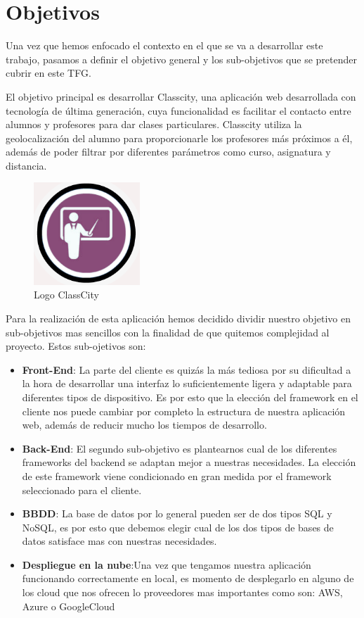 \chapter{Objetivos}
Una vez que hemos enfocado el contexto en el que se va a desarrollar este trabajo, pasamos a definir el objetivo general y los sub-objetivos que se pretender cubrir en este TFG.

El objetivo principal es desarrollar Classcity, una aplicación web desarrollada con tecnología de última  generación, cuya funcionalidad es facilitar el contacto entre alumnos y profesores para dar clases particulares. Classcity utiliza la geolocalización del alumno para proporcionarle los profesores más próximos a él, además de poder filtrar por diferentes parámetros como curso, asignatura y distancia.

\begin{figure}[!h]
    \centering
    \includegraphics[width=40mm]{img/introduccion/logo.jpg}
    \caption{Logo ClassCity}
\end{figure}

Para la realización de esta aplicación hemos decidido dividir nuestro objetivo en sub-objetivos mas sencillos con la finalidad de que quitemos complejidad al proyecto. Estos sub-ojetivos son:
\begin{itemize}

    \item \textbf {Front-End}: La parte del cliente es quizás la más tediosa por su dificultad a la hora de desarrollar una interfaz lo suficientemente ligera y adaptable para diferentes tipos de dispositivo. Es por esto que la elección del framework en el cliente nos puede cambiar por completo la estructura de nuestra aplicación web, además de reducir mucho los tiempos de desarrollo.

    \item \textbf {Back-End}: El segundo sub-objetivo es plantearnos cual de los diferentes frameworks del backend se adaptan mejor a nuestras necesidades. La elección de este framework viene condicionado en gran medida por el framework seleccionado para el cliente.

    \item \textbf {BBDD}: La base de datos por lo general pueden ser de dos tipos SQL y NoSQL, es por esto que debemos elegir cual de los dos tipos de bases de datos satisface mas con nuestras necesidades.

    \item \textbf {Despliegue en la nube}:Una vez que tengamos nuestra aplicación funcionando correctamente en local, es momento de desplegarlo en alguno de los cloud que nos ofrecen lo proveedores mas importantes como son: AWS, Azure o GoogleCloud


\end{itemize}
